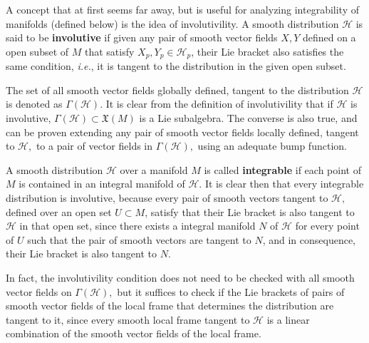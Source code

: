 \documentclass[12pt, letterpaper, reqno]{amsart}
\theoremstyle{definition}
\theoremstyle{plain}
\theoremstyle{remark}
\begin{document}
A concept that at first seems far away, but is useful for analyzing integrability of manifolds (defined below) is the idea of involutivility. A smooth distribution $ \mathcal{H} $ is said to be \textbf{involutive} if given any pair of smooth vector fields $ X,Y $ defined on a open subset of $ M $  that satisfy $X_p,Y_p\in \mathcal{H}_p $, their Lie bracket also satisfies the same condition, \textit{i.e.}, it is tangent to the distribution in the given open subset. 

The set of all smooth vector fields  globally defined, tangent to the distribution $ \mathcal{H} $ is denoted as $ \Gamma( \mathcal{H}) $. It is clear from the definition of involutivility that if $ \mathcal{H} $ is involutive, $ \Gamma (\mathcal{H})\subset \mathfrak{X}(M) $ is a Lie subalgebra. The converse is also true, and can be proven extending any pair of smooth vector fields locally defined, tangent to $ \mathcal{H} ,$ to a pair of vector fields in $ \Gamma( \mathcal{H}), $ using an adequate bump function. 

A smooth distribution $ \mathcal{H} $ over a manifold $ M $ is called \textbf{integrable} if each point of $ M $ is contained in an integral manifold of $ \mathcal{H}. $  It is clear then that every integrable distribution is involutive, because every pair of smooth vectors tangent to $ \mathcal{H}, $ defined over an open set $ U\subset M $, satisfy that their Lie bracket is also tangent to $ \mathcal{H} $ in that open set, since there exists a integral manifold $ N $  of $ \mathcal{H} $ for every point of $ U $ such that the pair of smooth vectors are tangent to $ N $, and in consequence, their Lie bracket is also tangent to $ N. $  

In fact, the involutivility condition does not need to be checked with all smooth vector fields on $ \Gamma( \mathcal{H}), $ but it suffices to check if the Lie brackets of pairs of smooth vector fields of the local frame that determines the distribution are tangent to it, since every smooth local frame tangent to $ \mathcal{H} $ is a linear combination of the smooth vector fields of the local frame. 

\nocite{*}

\end{document}

